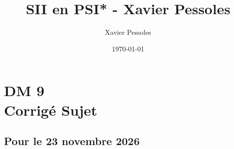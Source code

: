 \documentclass[
	fontsize=10pt, %
	twoside=false, %
]{kaobook}
\newcommand{\repRel}{../../../..}
\newcommand{\repStyle}{\repRel/Style}
\begin{document}

\titlehead{Document Template}
\title[SII en PSI* - Xavier Pessoles]{SII en PSI* - Xavier Pessoles}
\author[XP]{Xavier Pessoles}
\date{\today}

%
\frontmatter %


%
\mainmatter %


\setcounter{margintocdepth}{\sectiontocdepth}
\graphicspath{{\repStyle/png}}

\pagestyle{xp.scrheadings}



\newcommand{\repExo}{}
\newcommand{\nomExo}{}

\livrettrue %

\proffalse
\collefalse\colletrue
\normaltrue

\newcommand{\exer}{\subsection*}

\chapter*{DM 9 \\ 
\ifprof Corrigé \else Sujet \fi}


\section*{Pour le 23 novembre 2026}



\renewcommand{\repExo}{\repRel/PSI_ExercicesCompetences/DYN/DYN-04-TorseurDynamique/}
\renewcommand{\nomExo}{07_RR3D_02}
\graphicspath{{\repStyle/png}{\repExo\nomExo/images}}

\proffalse
 
\iflivret \else \proftrue

\fi
\end{document}
